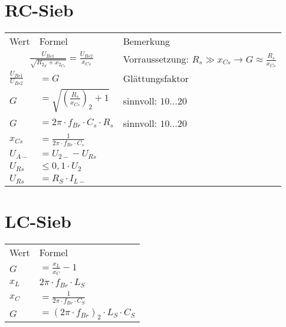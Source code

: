 \section{RC-Sieb}\label{sec:rc-sieb}
    \renewcommand{\arraystretch}{0.9}
    \begin{table}[H]
        \begin{tabularx}{\columnwidth}{l l l}
            Wert                        & Formel                                                    & Bemerkung \\
            \multicolumn{2}{c}{$\frac{U_{Br1}}{\sqrt{R_{2_S}+x_{2_{Cs}}}}=\frac{U_{Br2}}{x_{Cs}}$}  & Vorraussetzung: $R_s\gg x_{Cs}\to G\approx\frac{R_s}{x_{Cs}}$ \\
            $\frac{U_{Br1}}{U_{Br2}}$   & $=G$                                                      & Glättungsfaktor \\
            $G$                         & $=\sqrt{(\frac{R_s}{x_{Cs}})_2+1}$                        & sinnvoll: $10\dots 20$ \\
            $G$                         & $=2\pi\cdot f_{Br}\cdot C_s\cdot  R_s$                    & sinnvoll: $10\dots 20$ \\
            $x_{Cs}$                    & $=\frac{1}{2\pi\cdot f_{Br}\cdot C_s}$                    & \\
            $U_{A-}$                    & $=U_{2-}-U_{Rs}$                                          & \\
            $U_{Rs}$                    & $\leq 0,1\cdot U_2$                                       & \\
            $U_{Rs}$                    & $=R_S\cdot I_{L-}$                                        & \\
        \end{tabularx}
    \end{table}
      

\section{LC-Sieb}\label{sec:lc-sieb}
    \begin{minipage}{0.65\columnwidth}
        \begin{table}[H]
            \begin{tabularx}{\columnwidth}{l l}
                Wert    & Formel \\
                $G$     & $=\frac{x_L}{x_C}-1$ \\
                $x_L$   & $2\pi\cdot f_{Br}\cdot L_S$ \\
                $x_C$   & $=\frac{1}{2\pi\cdot f_{Br}\cdot C_S}$ \\
                $G$     & $=(2\pi\cdot f_{Br})_2\cdot L_S\cdot C_S$ \\
            \end{tabularx}
        \end{table}
    \end{minipage}
    \begin{minipage}{0.35\columnwidth}
    \end{minipage}

